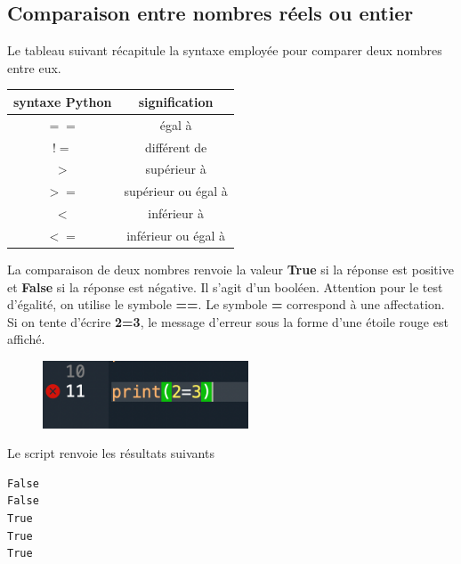 \documentclass[a4paper,12pt]{article}
\begin{document}
\subsection{Comparaison entre nombres réels ou entier}
\begin{leftbar}
Le tableau suivant r\'ecapitule la syntaxe employ\'ee pour comparer deux nombres entre eux.
\end{leftbar}
\begin{center}
	\begin{tabular}{|c|c|} \hline
syntaxe Python         &  signification \\ \hline
$==$                 &     \'egal \`a \\ \hline
$!=$                 &     diff\'erent de \\ \hline
    $>$                  &     sup\'erieur \`a \\ \hline
    $>=$                 &     sup\'erieur ou \'egal \`a \\ \hline
    $<$                  &     inf\'erieur \`a \\ \hline
    $<=$                 &     inf\'erieur ou \'egal \`a \\ \hline
    \end{tabular}
\end{center}
\begin{leftbar}
La comparaison de deux nombres renvoie la valeur \textbf{True} si la réponse est positive et \textbf{False} si la réponse est négative. Il s'agit d'un bool\'een. Attention pour le test d'égalité, on utilise le symbole \textbf{==}. Le symbole \textbf{=} correspond à une affectation. Si on tente d'écrire \textbf{2=3}, le message d'erreur sous la forme d'une étoile rouge est affiché.
\end{leftbar}
\begin{figure}[h]
\begin{center}
\includegraphics[height=2cm]{./png/erreur.png}
\end{center}
\end{figure}





Le script renvoie les résultats suivants
\begin{verbatim}
False
False
True
True
True
\end{verbatim}
\end{document}
